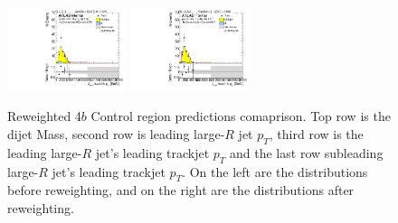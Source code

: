 \begin{figure}[htbp!]
\begin{center}
\includegraphics[angle=270, width=0.31\textwidth]{./figures/boosted/Prereweight/Moriond_FourTag_Control_sublHCand_trk0_Pt.pdf}
\includegraphics[angle=270, width=0.31\textwidth]{./figures/boosted/Control/b77_FourTag_Control_sublHCand_trk0_Pt.pdf}\\
\caption{Reweighted 4$b$ Control region predictions comaprison. Top row is the dijet Mass, second row is leading large-$R$ jet $p_{T}$, third row is the leading large-$R$ jet's leading trackjet $p_T$ and the last row subleading large-$R$ jet's leading trackjet $p_T$. On the left are the distributions before reweighting, and on the right are the distributions after reweighting.}
\label{fig:rw-4b-comp-cr}
\end{center}
\end{figure}

\clearpage
